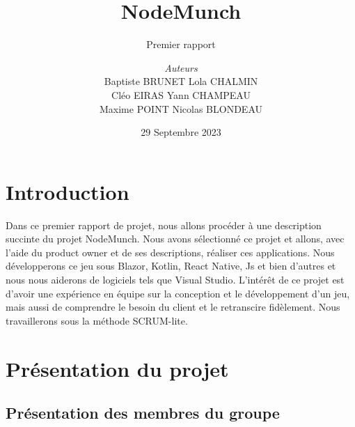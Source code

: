 \documentclass[a4paper, 12pt,table]{report}
\newcommand\tab[1][1cm]{\hspace*{#1}}
\begin{document}



\title{NodeMunch}
\subtitle{Premier rapport}
\author{\textit{Auteurs}\\
  Baptiste \textsc{BRUNET} \tab Lola \textsc{CHALMIN}\\
  Cléo \textsc{EIRAS} \tab \tab Yann \textsc{CHAMPEAU}\\
  \tab Maxime \textsc{POINT} \tab Nicolas \textsc{BLONDEAU}
}
\date{29 Septembre 2023}

\begin{titlepage}
\maketitle
\end{titlepage}



\tableofcontents

\setlength{\parindent}{3ex}



\chapter{Introduction}
Dans ce premier rapport de projet, nous allons procéder à une description succinte du projet NodeMunch. Nous avons sélectionné ce projet et allons, avec l'aide du product owner et de ses descriptions, réaliser ces applications. Nous développerons ce jeu sous Blazor, Kotlin, React Native, Js et bien d'autres et nous nous aiderons de logiciels tels que Visual Studio. L'intérêt de ce projet est d'avoir une expérience en équipe sur la conception et le développement d'un jeu, mais aussi de comprendre le besoin du client et le retranscire fidèlement. Nous travaillerons sous la méthode SCRUM-lite.

\clearpage



\chapter{Présentation du projet}

\section{Présentation des membres du groupe}
\end{document}
